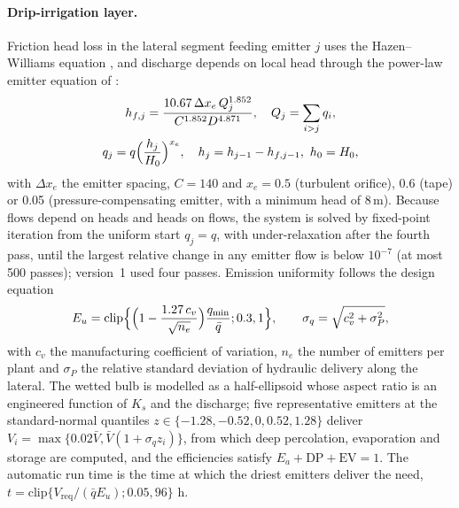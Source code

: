 \paragraph{Drip-irrigation layer.}
\label{sec:drip-m}
Friction head loss in the lateral segment feeding emitter $j$ uses the Hazen--Williams equation \citep{Hazen1905}, and discharge depends on local head through the power-law emitter equation of \citet{KellerKarmeli1974}:
\begin{equation}
\begin{gathered}h_{f,j}=\frac{10.67\,\Delta x_e\,Q_j^{1.852}}{C^{1.852}D^{4.871}},\quad Q_j=\sum_{i>j}q_i,\\ q_j=q\Bigl(\frac{h_j}{H_0}\Bigr)^{x_e},\quad h_j=h_{j-1}-h_{f,j-1},\ h_0=H_0,\end{gathered}
\label{eq:HW}
\end{equation}
with $\Delta x_e$ the emitter spacing, $C=140$ and $x_e=0.5$ (turbulent orifice), 0.6 (tape) or 0.05 (pressure-compensating emitter, with a minimum head of 8\,m). Because flows depend on heads and heads on flows, the system is solved by fixed-point iteration from the uniform start $q_j=q$, with under-relaxation after the fourth pass, until the largest relative change in any emitter flow is below $10^{-7}$ (at most 500 passes); version~1 used four passes. Emission uniformity follows the design equation
\begin{equation}
E_u=\mathrm{clip}\Bigl\{\Bigl(1-\frac{1.27\,c_v}{\sqrt{n_e}}\Bigr)\frac{q_{\min}}{\bar q};0.3,1\Bigr\},\qquad \sigma_q=\sqrt{c_v^2+\sigma_P^2},
\label{eq:Eu}
\end{equation}
with $c_v$ the manufacturing coefficient of variation, $n_e$ the number of emitters per plant and $\sigma_P$ the relative standard deviation of hydraulic delivery along the lateral. The wetted bulb is modelled as a half-ellipsoid whose aspect ratio is an engineered function of $K_s$ and the discharge; five representative emitters at the standard-normal quantiles $z\in\{-1.28,-0.52,0,0.52,1.28\}$ deliver $V_i=\max\{0.02\bar V,\bar V(1+\sigma_qz_i)\}$, from which deep percolation, evaporation and storage are computed, and the efficiencies satisfy $E_a+\mathrm{DP}+\mathrm{EV}=1$. The automatic run time is the time at which the driest emitters deliver the need, $t=\mathrm{clip}\{V_{\mathrm{req}}/(\bar qE_u);0.05,96\}$ h.

